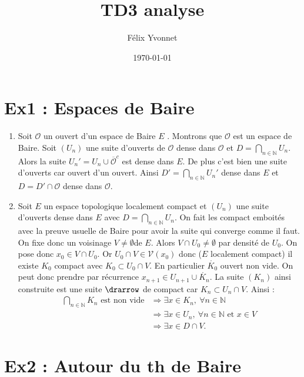 \documentclass[a4paper]{article}
\title{TD3 analyse}
\author{Félix Yvonnet}
\date{\today}
\begin{document}
\maketitle

\section*{Ex1 : Espaces de Baire}
\begin{enumerate}
    \item Soit $\mathcal{O}$ un ouvert d'un espace de Baire $E$ . Montrons que $\mathcal{O}$ est un espace de Baire. Soit $(U_n)$ une suite d'ouverts de $\mathcal{O}$ dense dans $\mathcal{O}$ et $D=\bigcap\limits_{n\in \mathbb{N} } U_n$. Alors la suite $U_n'=U_n\cup \overline{\mathcal{O}}^c$  est dense dans $E$. De plus c'est bien une suite d'ouverts car ouvert d'un ouvert. Ainsi $D'=\bigcap\limits_{n\in \mathbb{N} } U_n'$ dense dans $E$ et $D=D'\cap \mathcal{O}$ dense dans $\mathcal{O}.$ 
    \item\label{q2} Soit $E$ un espace topologique localement compact et $(U_n)$ une suite d'ouverts dense dans $E$ avec $D=\bigcap\limits_{n\in \mathbb{N} } U_n.$  On fait les compact emboités avec la preuve usuelle de Baire pour avoir la suite qui converge comme il faut. \\
        On fixe donc un voisinage $V\neq \emptyset $de $E.$ Alors $V\cap U_0\neq \emptyset $ par densité de $U_0.$ On pose donc $x_0\in V\cap U_0.$ Or $U_0\cap V\in \mathcal{V}(x_0)$ donc ($E$ localement compact) il existe $K_0$ compact avec $K_0\subset U_0\cap V.$ En particulier $\mathring{K_0}$ ouvert non vide. On peut donc prendre par récurrence $x_{n+1}\in U_{n+1}\cup \mathring{K_{n}}$. La suite $(K_n)$ ainsi construite est une suite $\drarrow$ de compact car $K_n\subset U_n\cap V$. Ainsi :
        \begin{align*}
            \bigcap\limits_{n\in \mathbb{N} } K_n \text{ est non vide} &\Rightarrow \exists x\in K_n,\ \forall n\in \mathbb{N}  \\
                &\Rightarrow \exists x\in U_n,\ \forall n\in \mathbb{N} \text{ et } x\in V\\
                &\Rightarrow \exists x\in D\cap V. 
        \end{align*}
\end{enumerate}


\section*{Ex2 : Autour du th de Baire}
\end{document}

